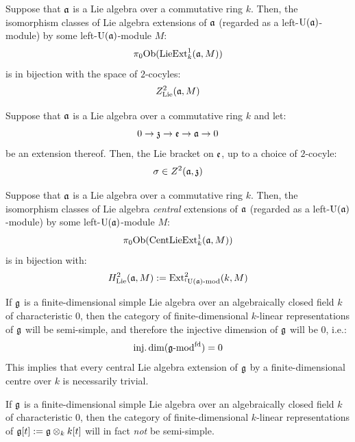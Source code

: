         \begin{lemma}[$Z^2_{\Lie}$ = all extensions]
            Suppose that $\mathfrak{a}$ is a Lie algebra over a commutative ring $k$. Then, the isomorphism classes of Lie algebra extensions of $\mathfrak{a}$ (regarded as a left-$\mathrm{U}(\mathfrak{a})$-module) by some left-$\mathrm{U}(\mathfrak{a})$-module $M$:
                $$\pi_0\mathrm{Ob}( \mathrm{Lie}\mathrm{Ext}^1_k(\mathfrak{a}, M) )$$
            is in bijection with the space of $2$-cocyles:
                $$Z^2_{\mathrm{Lie}}(\mathfrak{a}, M)$$
        \end{lemma}
        \begin{corollary}[Extensions = semi-direct products]
            Suppose that $\mathfrak{a}$ is a Lie algebra over a commutative ring $k$ and let:
                $$0 \to \mathfrak{z} \to \mathfrak{e} \to \mathfrak{a} \to 0$$
            be an extension thereof. Then, the Lie bracket on $\mathfrak{e}$, up to a choice of $2$-cocyle:
                $$\sigma \in Z^2(\mathfrak{a}, \mathfrak{z})$$
            
        \end{corollary}
        \begin{proposition}[$H^2_{\Lie}$ = central extensions]
            \cite[Theorem VIII.3.3]{hilton_stammbach_homological_algebra} Suppose that $\mathfrak{a}$ is a Lie algebra over a commutative ring $k$. Then, the isomorphism classes of Lie algebra \textit{central} extensions of $\mathfrak{a}$ (regarded as a left-$\mathrm{U}(\mathfrak{a})$-module) by some left-$\mathrm{U}(\mathfrak{a})$-module $M$:
                $$\pi_0\mathrm{Ob}( \mathrm{Cent}\mathrm{Lie}\mathrm{Ext}^1_k(\mathfrak{a}, M) )$$
            is in bijection with:
                $$H^2_{\mathrm{Lie}}(\mathfrak{a}, M) := \mathrm{Ext}^2_{{}^l\mathrm{U}(\mathfrak{a})\text{-}\mathrm{mod}}(k, M)$$
        \end{proposition}
        \begin{example}
            If $\mathfrak{g}$ is a finite-dimensional simple Lie algebra over an algebraically closed field $k$ of characteristic $0$, then the category of finite-dimensional $k$-linear representations of $\mathfrak{g}$ will be semi-simple, and therefore the injective dimension of $\mathfrak{g}$ will be $0$, i.e.:
                $$\operatorname{inj.dim}(\mathfrak{g}\text{-}\mathrm{mod}^{\mathrm{fd}}) = 0$$
            This implies that every central Lie algebra extension of $\mathfrak{g}$ by a finite-dimensional centre over $k$ is necessarily trivial. 
        \end{example}
        \begin{example}
            If $\mathfrak{g}$ is a finite-dimensional simple Lie algebra over an algebraically closed field $k$ of characteristic $0$, then the category of finite-dimensional $k$-linear representations of $\g[t] := \g \tensor_k k[t]$ will in fact \textit{not} be semi-simple. 
        \end{example}

